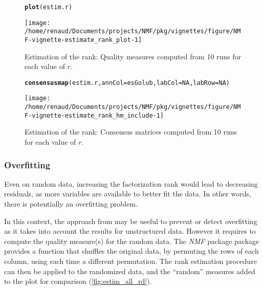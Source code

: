\documentclass[a4paper]{article}\usepackage[]{graphicx}\usepackage[]{color}
\makeatletter
\def\maxwidth{ %
  \ifdim\Gin@nat@width>\linewidth
    \linewidth
  \else
    \Gin@nat@width
  \fi
}
\newcommand{\hlnum}[1]{\textcolor[rgb]{0.686,0.059,0.569}{#1}}%
\newcommand{\hlstd}[1]{\textcolor[rgb]{0.345,0.345,0.345}{#1}}%
\newcommand{\hlkwc}[1]{\textcolor[rgb]{0.333,0.667,0.333}{#1}}%
\newcommand{\hlkwd}[1]{\textcolor[rgb]{0.737,0.353,0.396}{\textbf{#1}}}%
\newenvironment{kframe}{%
 \def\at@end@of@kframe{}%
 \ifinner\ifhmode%
  \def\at@end@of@kframe{\end{minipage}}%
  \begin{minipage}{\columnwidth}%
 \fi\fi%
 \def\FrameCommand##1{\hskip\@totalleftmargin \hskip-\fboxsep
 \colorbox{shadecolor}{##1}\hskip-\fboxsep
     \hskip-\linewidth \hskip-\@totalleftmargin \hskip\columnwidth}%
 \MakeFramed {\advance\hsize-\width
   \@totalleftmargin\z@ \linewidth\hsize
   \@setminipage}}%
 {\par\unskip\endMakeFramed%
 \at@end@of@kframe}
\newenvironment{knitrout}{}{} %
\newcommand{\pkgname}[1]{\textit{#1}\xspace}
\newcommand{\Rpkg}[1]{\pkgname{#1} package\xspace}
\newcommand{\nmfpack}{\Rpkg{NMF}}
\renewcommand{\cite}[1]{\parencite{#1}}
\makeatother
\begin{document}
\begin{figure}
\begin{knitrout}
\color{fgcolor}\begin{kframe}
\begin{alltt}
\hlkwd{plot}\hlstd{(estim.r)}
\end{alltt}
\end{kframe}
\texttt{[image: /home/renaud/Documents/projects/NMF/pkg/vignettes/figure/NMF-vignette-estimate\_rank\_plot-1]} 

\end{knitrout}
\caption{Estimation of the rank: Quality measures computed from 10 runs for each value of $r$. \label{fig:estim_all}}
\end{figure}

\begin{figure}
\begin{knitrout}
\color{fgcolor}\begin{kframe}
\begin{alltt}
\hlkwd{consensusmap}\hlstd{(estim.r,} \hlkwc{annCol}\hlstd{=esGolub,} \hlkwc{labCol}\hlstd{=}\hlnum{NA}\hlstd{,} \hlkwc{labRow}\hlstd{=}\hlnum{NA}\hlstd{)}
\end{alltt}
\end{kframe}
\texttt{[image: /home/renaud/Documents/projects/NMF/pkg/vignettes/figure/NMF-vignette-estimate\_rank\_hm\_include-1]} 

\end{knitrout}
\caption{Estimation of the rank: Consensus matrices computed from 10 runs for each value of $r$. \label{fig:estim_all_hm}}
\end{figure}

\subsubsection{Overfitting}
Even on random data, increasing the factorization rank would lead to decreasing residuals, as more variables are available to better fit the data.
In other words, there is potentially an overfitting problem. 
 
In this context, the approach from \cite{Frigyesi2008} may be useful to prevent or detect overfitting as it takes into account the results for unstructured data.
However it requires to compute the quality measure(s) for the random data.
The \nmfpack package provides a function that shuffles the original data, by permuting the rows of each column, using each time a different permutation.
The rank estimation procedure can then be applied to the randomized data, and the ``random'' measures added to the plot for comparison (\cref{fig:estim_all_rd}).
\end{document}
